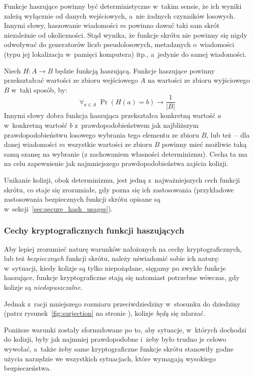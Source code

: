 \documentclass[12pt,a4paper,twoside]{article}
\begin{document}
Funkcje haszujące powinny być deterministyczne w~takim sensie, że ich wyniki
zależą wyłącznie od danych wejściowych, a~nie żadnych czynników losowych.
Innymi słowy, haszowanie wiadomości $m$ powinno dawać taki sam skrót
niezależnie od okoliczności. Stąd wynika, że funkcje skrótu nie powinny się
nigdy odwoływać do generatorów liczb pseudolosowych, metadanych o~wiadomości
(typu jej lokalizacja w~pamięci komputera) itp., a~jedynie do samej wiadomości.

Niech $H : A \to B$ będzie funkcją haszującą. Funkcje haszujące powinny
przekształcać wartości ze zbioru wejściowego $A$ na wartości ze zbioru
wyjściowego $B$ w~taki sposób, by:
\[
    \forall_{a \in A} \; \Pr(H(a) = b) \to \frac{1}{|B|}
\]
Innymi słowy dobra funkcja haszująca przekształca konkretną wartość $a$
w~konkretną wartość $b$ z~prawdopodobieństwem jak najbliższym
prawdopodobieństwu losowego wybrania tego elementu ze zbioru $B$, lub też~--
dla danej wiadomości $m$ wszystkie wartości ze zbioru $B$ powinny mieć możliwie
taką samą szansę na wybranie (z zachowaniem własności determinizmu). Cecha ta
ma na celu zapewnienie jak najmniejszego prawdopodobieństwa zajścia kolizji.

Unikanie kolizji, obok determinizmu, jest jedną z~najważniejszych cech funkcji
skrótu, co staje się zrozumiałe, gdy pozna się ich zastosowania (przykładowe
zastosowania bezpiecznych funkcji skrótu opisane są
w~sekcji~\ref{sec:secure_hash_usages}).



\subsubsection{Cechy kryptograficznych funkcji haszujących}
\label{sec:secure_hash_attributes}
Aby lepiej zrozumieć naturę warunków nałożonych na cechy kryptograficznych, lub
też \emph{bezpiecznych} funkcji skrótu, należy uświadomić sobie ich naturę:
w~sytuacji, kiedy kolizje są tylko niepożądane, sięgamy po zwykłe funkcje
haszujące, funkcje kryptograficzne stają się natomiast potrzebne wówczas, gdy
kolizje są \emph{niedopuszczalne}.

Jednak z~racji mniejszego rozmiaru przeciwdziedziny w~stosunku do dziedziny
(patrz rysunek~\ref{fig:surjection} na stronie \pageref{fig:surjection}),
kolizje \emph{będą} się zdarzać.

Poniższe warunki zostały sformułowane po to, aby sytuacje, w~których dochodzi
do kolizji, były jak najmniej prawdopodobne i~żeby było trudno je celowo
wywołać, a~także żeby same kryptograficzne funkcje skrótu stanowiły godne
użycia narzędzie we wszystkich sytuacjach, które wymagają wysokiego
bezpieczeństwa.
\end{document}
